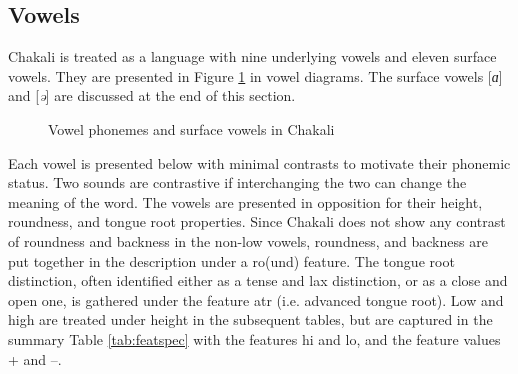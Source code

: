 
\subsection{Vowels}
\label{sec:vowels}

Chakali is treated as a language with nine underlying vowels and eleven
surface vowels. They
are presented in Figure \ref{fig:Phon-phon-srf} in  vowel diagrams.  The 
surface vowels  
[{\it ɑ}]
and  [{\it ə}] are discussed  at the end of this section. 


\begin{figure}[!htb]
\centering

\qquad
{}

\caption{Vowel phonemes and surface vowels in Chakali \label{fig:Phon-phon-srf}}
\end{figure}



Each vowel is presented below with minimal contrasts to motivate their phonemic
status.   Two sounds are contrastive if interchanging the two can change the
meaning of the word. The vowels are presented in opposition for their height,
roundness,  and tongue root properties. Since Chakali does not show any
contrast of roundness and backness in the non-low vowels, roundness, and 
backness
  are put together in the description under a {\sc ro}(und) feature. The tongue
root
distinction, often identified either as a tense and lax distinction, or as a
close and open one,  is gathered under the feature {\sc atr} (i.e. advanced
tongue root). Low and high are treated under {\sc height} in the
subsequent tables, but are captured in the summary Table \ref{tab:featspec}
with the features {\sc hi}   and {\sc lo},  and the feature values +
and --. 



